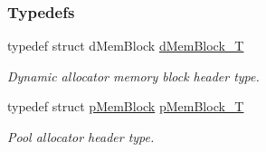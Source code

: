 \subsubsection*{Typedefs}
\begin{DoxyCompactItemize}
\item 
typedef struct d\-Mem\-Block \hyperlink{group__mem__impl_ga426d7b4525653e3c90bf3fef9d443373}{d\-Mem\-Block\-\_\-\-T}
\begin{DoxyCompactList}\small\item\em Dynamic allocator memory block header type. \end{DoxyCompactList}\item 
typedef struct \hyperlink{structpMemBlock}{p\-Mem\-Block} \hyperlink{group__mem__impl_gad80b53ee7c1b89f2d48d9670b0c09ceb}{p\-Mem\-Block\-\_\-\-T}
\begin{DoxyCompactList}\small\item\em Pool allocator header type. \end{DoxyCompactList}\end{DoxyCompactItemize}
